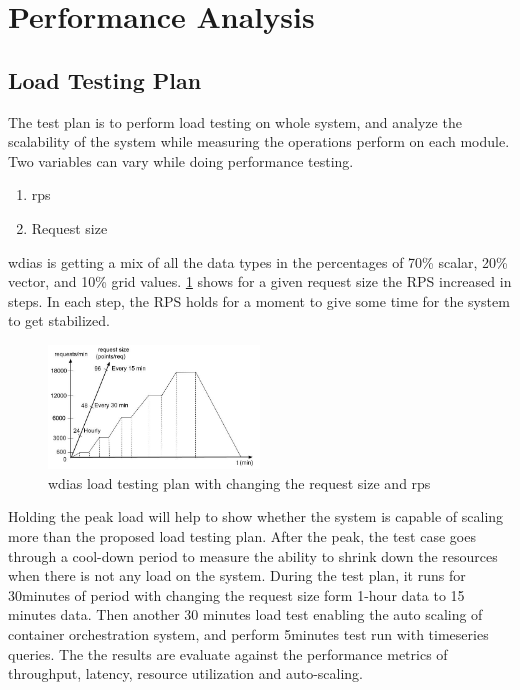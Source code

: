 \documentclass[conference]{IEEEtran}
\begin{document}
\section{Performance Analysis}
\label{pse:performance_analysis}

\subsection{Load Testing Plan}
\label{psubse:test_plan}

The test plan is to perform load testing on whole system, and analyze the scalability of the system while measuring the operations perform on each module. Two variables can vary while doing performance testing.
\begin{enumerate}
    \item \acrfull{rps}
    \item Request size
\end{enumerate}

\acrshort{wdias} is getting a mix of all the data types in the percentages of 70\% scalar, 20\% vector, and 10\% grid values. \cref{pfi:performance_study} shows for a given request size the RPS increased in steps. In each step, the RPS holds for a moment to give some time for the system to get stabilized.

\begin{figure}[htbp]
\centerline{\includegraphics[width=0.5\textwidth]{results/work_load/performance_study_v4.jpg}}
\caption{\acrshort{wdias} load testing plan with changing the request size and \acrshort{rps}}
\label{pfi:performance_study}
\end{figure}

Holding the peak load will help to show whether the system is capable of scaling more than the proposed load testing plan. After the peak, the test case goes through a cool-down period to measure the ability to shrink down the resources when there is not any load on the system. During the test plan, it runs for 30minutes of period with changing the request size form 1-hour data to 15 minutes data. Then another 30 minutes load test enabling the auto scaling of container orchestration system, and perform 5minutes test run with timeseries queries. The the results are evaluate against the performance metrics of throughput, latency, resource utilization and auto-scaling.
\end{document}
